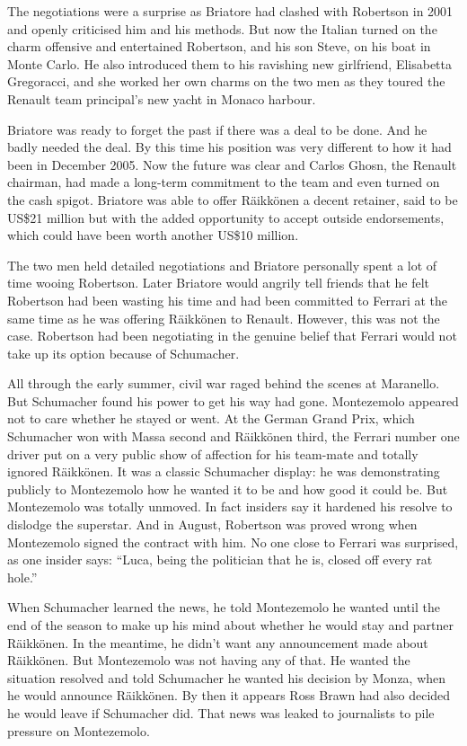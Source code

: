\documentclass{article}
\begin{document}
The negotiations were a surprise as Briatore had clashed with Robertson in 2001 and openly criticised him and his methods. But now the Italian turned on the charm offensive and entertained Robertson, and his son Steve, on his boat in Monte Carlo. He also introduced them to his ravishing new girlfriend, Elisabetta Gregoracci, and she worked her own charms on the two men as they toured the Renault team principal’s new yacht in Monaco harbour.

Briatore was ready to forget the past if there was a deal to be done. And he badly needed the deal. By this time his position was very different to how it had been in December 2005. Now the future was clear and Carlos Ghosn, the Renault chairman, had made a long-term commitment to the team and even turned on the cash spigot. Briatore was able to offer Räikkönen a decent retainer, said to be US\$21 million but with the added opportunity to accept outside endorsements, which could have been worth another US\$10 million.

The two men held detailed negotiations and Briatore personally spent a lot of time wooing Robertson. Later Briatore would angrily tell friends that he felt Robertson had been wasting his time and had been committed to Ferrari at the same time as he was offering Räikkönen to Renault. However, this was not the case. Robertson had been negotiating in the genuine belief that Ferrari would not take up its option because of Schumacher.

All through the early summer, civil war raged behind the scenes at Maranello. But Schumacher found his power to get his way had gone. Montezemolo appeared not to care whether he stayed or went. At the German Grand Prix, which Schumacher won with Massa second and Räikkönen third, the Ferrari number one driver put on a very public show of affection for his team-mate and totally ignored Räikkönen. It was a classic Schumacher display: he was demonstrating publicly to Montezemolo how he wanted it to be and how good it could be. But Montezemolo was totally unmoved. In fact insiders say it hardened his resolve to dislodge the superstar. And in August, Robertson was proved wrong when Montezemolo signed the contract with him. No one close to Ferrari was surprised, as one insider says: “Luca, being the politician that he is, closed off every rat hole.”

When Schumacher learned the news, he told Montezemolo he wanted until the end of the season to make up his mind about whether he would stay and partner Räikkönen. In the meantime, he didn’t want any announcement made about Räikkönen. But Montezemolo was not having any of that. He wanted the situation resolved and told Schumacher he wanted his decision by Monza, when he would announce Räikkönen. By then it appears Ross Brawn had also decided he would leave if Schumacher did. That news was leaked to journalists to pile pressure on Montezemolo.
\end{document}
